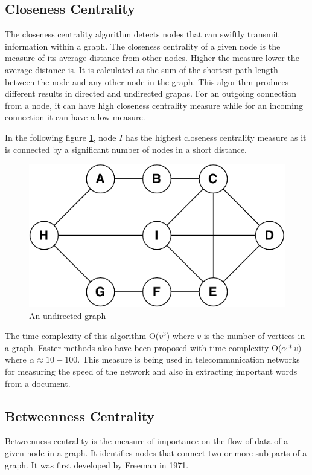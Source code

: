 \documentclass[journal,twoside,web]{ieeecolor}
\begin{document}
\subsection{Closeness Centrality}
The closeness centrality algorithm detects nodes that can swiftly transmit information within a graph. The closeness centrality of a given node is the measure of its average distance from other nodes. Higher the measure lower the average distance is. It is calculated as the sum of the shortest path length between the node and any other node in the graph. This algorithm produces different results in directed and undirected graphs. For an outgoing connection from a node, it can have high closeness centrality measure while for an incoming connection it can have a low measure.

In the following figure \ref{fig14}, node $I$ has the highest closeness centrality measure as it is connected by a significant number of nodes in a short distance.

\begin{figure}[!h]
    \centerline{\includegraphics[scale=0.8]{figures/closeness.pdf}}
    \caption{An undirected graph}
    \label{fig14}
\end{figure}

The time complexity of this algorithm O($v^3$) where $v$ is the number of vertices in a graph. Faster methods also have been proposed with time complexity O($\alpha * v$) where $\alpha \approx 10 - 100$\cite{59}. This measure is being used in telecommunication networks for measuring the speed of the network and also in extracting important words from a document.

\subsection{Betweenness Centrality}
Betweenness centrality is the measure of importance on the flow of data of a given node in a graph. It identifies nodes that connect two or more sub-parts of a graph. It was first developed by Freeman in 1971\cite{32}.
\end{document}
